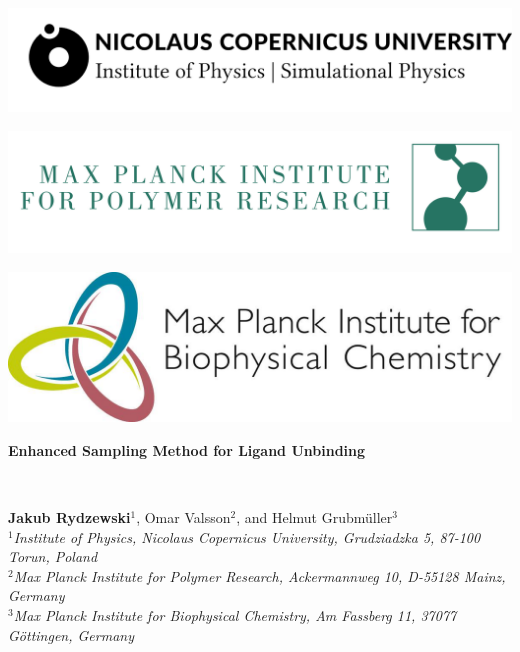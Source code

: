 \documentclass[a0,portrait]{a0poster}
\begin{document}
\begin{minipage}[b]{0.3\linewidth}
\centering
\includegraphics[width=25cm]{../fig/umk.png}
\end{minipage}\hspace*{4cm}
\begin{minipage}[b]{0.3\linewidth}
\centering
\includegraphics[width=23cm]{../fig/mpip.png}
\end{minipage}\hspace*{3cm}
\begin{minipage}[b]{0.3\linewidth}
\centering
\includegraphics[width=16cm]{../fig/helmut.jpg}
\end{minipage}

\vspace{1cm}

\begin{minipage}[b]{\linewidth}
\veryHuge\centering\color{myblue} 
\begin{minipage}[b]{\linewidth}
\textbf{Enhanced Sampling Method for Ligand Unbinding}
  \end{minipage}
\end{minipage}
\color{Black}\\[1cm]
\begin{minipage}[b]{\linewidth}
  \huge \textbf{Jakub Rydzewski$^1$}, Omar Valsson$^2$, and Helmut
  Grubm\"{u}ller$^3$\\[1cm]
\large\textit{$^1$Institute of Physics, Nicolaus Copernicus University,
  Grudziadzka 5, 87-100 Torun, Poland}\\
\large\textit{$^2$Max Planck Institute for Polymer Research, Ackermannweg 10,
  D-55128 Mainz, Germany}\\
\large\textit{$^3$Max Planck Institute for Biophysical Chemistry, Am Fassberg 11,
  37077 Göttingen, Germany}\\
\end{minipage}
\end{document}
